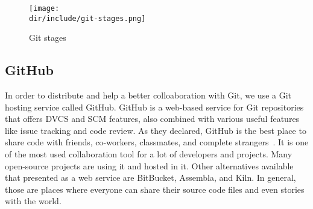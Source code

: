 \begin{figure}[htb]
    \centering
    \texttt{[image: \\dir/include/git-stages.png]}
    \caption{Git stages}
    \label{fig:git}
\end{figure}

\subsection{GitHub}

In order to distribute and help a better colloaboration with Git, we use a Git hosting service called GitHub.
GitHub is a web-based service for Git repositories that offers \ac{DVCS} and \ac{SCM} features, also combined with various useful features like issue tracking and code review.
As they declared, GitHub is the best place to share code with friends, co-workers, classmates, and complete strangers~\autocite{GitHub2015}.
It is one of the most used collaboration tool for a lot of developers and projects.
Many open-source projects are using it and hosted in it.
Other alternatives available that presented as a web service are BitBucket, Assembla, and Kiln.
In general, those are places where everyone can share their source code files and even stories with the world.
